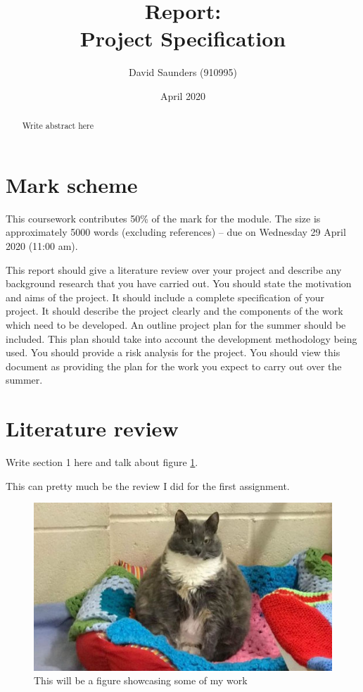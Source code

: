 \documentclass{article}
\title{Report:\\
    \large Project Specification
}
\author{David Saunders (910995)}
\date{April 2020}
\begin{document}
\maketitle

\begin{abstract} 
    Write abstract here
\end{abstract}

\tableofcontents

\section{Mark scheme}
This coursework contributes 50\% of the mark for the module. The size is
approximately 5000 words (excluding references) – due on Wednesday 29
April 2020 (11:00 am).

This report should give a literature review over your project and describe
any background research that you have carried out. You should state the motivation and aims of the project. It should include a complete specification
of your project. It should describe the project clearly and the components
of the work which need to be developed. An outline project plan for the
summer should be included. This plan should take into account the development methodology being used. You should provide a risk analysis for the
project. You should view this document as providing the plan for the work
you expect to carry out over the summer.

\section{Literature review}

Write section 1 here \cite{torsney2011tuner} and talk about figure \ref{fig:test}.

This can pretty much be the review I did for the first assignment. 

\begin{figure}[ht]
    \centering
    \includegraphics[scale=0.35]{Test.JPG}
    \caption{This will be a figure showcasing some of my work}
    \label{fig:test}
\end{figure}
\end{document}
